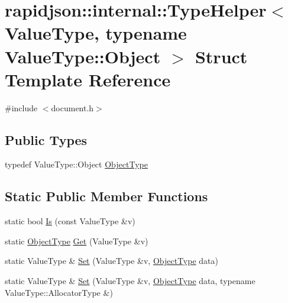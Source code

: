 \hypertarget{structrapidjson_1_1internal_1_1_type_helper_3_01_value_type_00_01typename_01_value_type_1_1_object_01_4}{}\section{rapidjson\+::internal\+::Type\+Helper$<$ Value\+Type, typename Value\+Type\+::Object $>$ Struct Template Reference}
\label{structrapidjson_1_1internal_1_1_type_helper_3_01_value_type_00_01typename_01_value_type_1_1_object_01_4}


{\ttfamily \#include $<$document.\+h$>$}

\subsection*{Public Types}
\begin{DoxyCompactItemize}
\item 
typedef Value\+Type\+::\+Object \mbox{\hyperlink{structrapidjson_1_1internal_1_1_type_helper_3_01_value_type_00_01typename_01_value_type_1_1_object_01_4_a19042ef4796b8aa989bb1d0b00624fe6}{Object\+Type}}
\end{DoxyCompactItemize}
\subsection*{Static Public Member Functions}
\begin{DoxyCompactItemize}
\item 
static bool \mbox{\hyperlink{structrapidjson_1_1internal_1_1_type_helper_3_01_value_type_00_01typename_01_value_type_1_1_object_01_4_a8bf997834b198dda6f961aba88671215}{Is}} (const Value\+Type \&v)
\item 
static \mbox{\hyperlink{structrapidjson_1_1internal_1_1_type_helper_3_01_value_type_00_01typename_01_value_type_1_1_object_01_4_a19042ef4796b8aa989bb1d0b00624fe6}{Object\+Type}} \mbox{\hyperlink{structrapidjson_1_1internal_1_1_type_helper_3_01_value_type_00_01typename_01_value_type_1_1_object_01_4_a2723100f72c9c523913e6a2faeaf1d3e}{Get}} (Value\+Type \&v)
\item 
static Value\+Type \& \mbox{\hyperlink{structrapidjson_1_1internal_1_1_type_helper_3_01_value_type_00_01typename_01_value_type_1_1_object_01_4_a3bd0cf8fab770a63df903486a8781aef}{Set}} (Value\+Type \&v, \mbox{\hyperlink{structrapidjson_1_1internal_1_1_type_helper_3_01_value_type_00_01typename_01_value_type_1_1_object_01_4_a19042ef4796b8aa989bb1d0b00624fe6}{Object\+Type}} data)
\item 
static Value\+Type \& \mbox{\hyperlink{structrapidjson_1_1internal_1_1_type_helper_3_01_value_type_00_01typename_01_value_type_1_1_object_01_4_a8ec60af2de27c82c647f771c3e9014fe}{Set}} (Value\+Type \&v, \mbox{\hyperlink{structrapidjson_1_1internal_1_1_type_helper_3_01_value_type_00_01typename_01_value_type_1_1_object_01_4_a19042ef4796b8aa989bb1d0b00624fe6}{Object\+Type}} data, typename Value\+Type\+::\+Allocator\+Type \&)
\end{DoxyCompactItemize}


